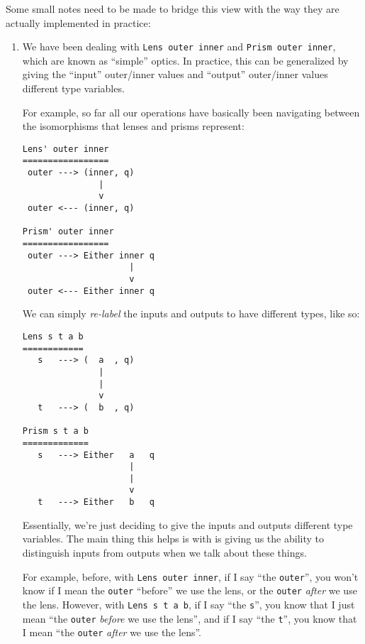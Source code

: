 \documentclass[]{article}
\begin{document}
Some small notes need to be made to bridge this view with the way they are
actually implemented in practice:

\begin{enumerate}
\def\labelenumi{\arabic{enumi}.}
\item
  We have been dealing with \texttt{Lens\textquotesingle{}\ outer\ inner} and
  \texttt{Prism\textquotesingle{}\ outer\ inner}, which are known as ``simple''
  optics. In practice, this can be generalized by giving the ``input''
  outer/inner values and ``output'' outer/inner values different type variables.

  For example, so far all our operations have basically been navigating between
  the isomorphisms that lenses and prisms represent:

\begin{verbatim}
Lens' outer inner
=================
 outer ---> (inner, q)
               |
               v
 outer <--- (inner, q)

Prism' outer inner
=================
 outer ---> Either inner q
                     |
                     v
 outer <--- Either inner q
\end{verbatim}

  We can simply \emph{re-label} the inputs and outputs to have different types,
  like so:

\begin{verbatim}
Lens s t a b
============
   s   ---> (  a  , q)
               |
               |
               v
   t   ---> (  b  , q)

Prism s t a b
=============
   s   ---> Either   a   q
                     |
                     |
                     v
   t   ---> Either   b   q
\end{verbatim}

  Essentially, we're just deciding to give the inputs and outputs different type
  variables. The main thing this helps is with is giving us the ability to
  distinguish inputs from outputs when we talk about these things.

  For example, before, with \texttt{Lens\textquotesingle{}\ outer\ inner}, if I
  say ``the \texttt{outer}'', you won't know if I mean the \texttt{outer}
  ``before'' we use the lens, or the \texttt{outer} \emph{after} we use the
  lens. However, with \texttt{Lens\ s\ t\ a\ b}, if I say ``the \texttt{s}'',
  you know that I just mean ``the \texttt{outer} \emph{before} we use the
  lens'', and if I say ``the \texttt{t}'', you know that I mean ``the
  \texttt{outer} \emph{after} we use the lens''.


\end{enumerate}
\end{document}
